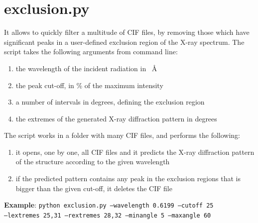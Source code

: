 \documentclass{article}
\begin{document}
\section{exclusion.py}
It allows to quickly filter a multitude of CIF files, by removing those which have significant peaks in a user-defined exclusion region of the X-ray spectrum. The script takes the following arguments from command line:
\begin{enumerate}
	\item the wavelength of the incident radiation in \SI{}{\angstrom}
	\item the peak cut-off, in \% of the maximum intensity
	\item a number of intervals in degrees, defining the exclusion region
	\item the extremes of the generated X-ray diffraction pattern in degrees
\end{enumerate}
The script works in a folder with many CIF files, and performs the following:
\begin{enumerate}
	\item it opens, one by one, all CIF files and it predicts the X-ray diffraction pattern of the structure according to the given wavelength
	\item if the predicted pattern contains any peak in the exclusion regions that is bigger than the given cut-off, it deletes the CIF file
\end{enumerate}
\textbf{Example}: \texttt{python exclusion.py --wavelength 0.6199 --cutoff 25 \\ --lextremes 25,31 --rextremes 28,32 --minangle 5 --maxangle 60}
\end{document}
